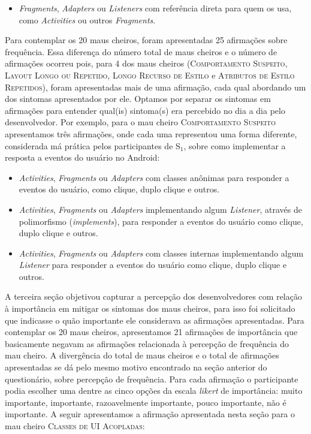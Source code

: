 \begin{itemize}
 \item \textit{Fragments}, \textit{Adapters} ou \textit{Listeners} com referência direta para quem os usa, como \textit{Activities} ou outros \textit{Fragments}.
\end{itemize}

Para contemplar os 20 maus cheiros, foram apresentadas 25 afirmações sobre frequência. Essa diferença do número total de maus cheiros e o número de afirmações ocorreu pois, para 4 dos maus cheiros (\textsc{\small Comportamento Suspeito}, \textsc{\small Layout Longo ou Repetido}, \textsc{\small Longo Recurso de Estilo} e \textsc{\small Atributos de Estilo Repetidos}), foram apresentadas mais de uma afirmação, cada qual abordando um dos sintomas apresentados por ele. Optamos por separar os sintomas em afirmações para entender qual(is) sintoma(s) era percebido no dia a dia pelo desenvolvedor. Por exemplo, para o mau cheiro \textsc{\small Comportamento Suspeito} apresentamos três afirmações, onde cada uma representou uma forma diferente, considerada má prática pelos participantes de S$_1$, sobre como implementar a resposta a eventos do usuário no Android:

\begin{itemize}
  \item \textit{Activities}, \textit{Fragments} ou \textit{Adapters} com classes anônimas para responder a eventos do usuário, como clique, duplo clique e outros.

  \item \textit{Activities}, \textit{Fragments} ou \textit{Adapters} implementando algum \textit{Listener}, através de polimorfismo (\textit{implements}), para responder a eventos do usuário como clique, duplo clique e outros.

  \item \textit{Activities}, \textit{Fragments} ou \textit{Adapters} com classes internas implementando algum \textit{Listener} para responder a eventos do usuário como clique, duplo clique e outros.
\end{itemize}

A terceira seção objetivou capturar a percepção dos desenvolvedores com relação à importância em mitigar os sintomas dos maus cheiros, para isso foi solicitado que indicasse o quão importante ele considerava as afirmações apresentadas. Para contemplar os 20 maus cheiros, apresentamos 21 afirmações de importância que basicamente negavam as afirmações relacionada à percepção de frequência do mau cheiro. A divergência do total de maus cheiros e o total de afirmações apresentadas se dá pelo mesmo motivo encontrado na seção anterior do questionário, sobre percepção de frequência. Para cada afirmação o participante podia escolher uma dentre as cinco opções da escala \textit{likert} de importância: muito importante, importante, razoavelmente importante, pouco importante, não é importante. A seguir apresentamos a afirmação apresentada nesta seção para o mau cheiro \textsc{\small Classes de UI Acopladas}:

